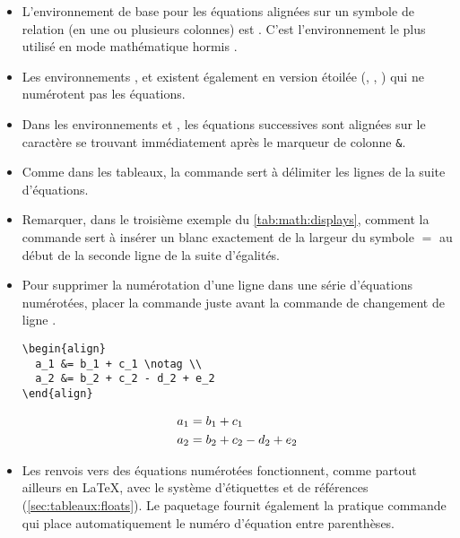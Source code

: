 \begin{itemize}
\item L'environnement de base pour les équations alignées sur un
  symbole de relation (en une ou plusieurs colonnes) est .
  C'est l'environnement le plus utilisé en mode mathématique hormis
  .
\item Les environnements ,  et 
  existent également en version étoilée (, ,
  ) qui ne numérotent pas les équations.
\item Dans les environnements  et , les équations
  successives sont alignées sur le caractère se trouvant immédiatement
  après le marqueur de colonne \verb=&=.
\item Comme dans les tableaux, la commande {\pixbsbs} sert à
  délimiter les lignes de la suite d'équations.
\item Remarquer, dans le troisième exemple du
  \autoref{tab:math:displays}, comment la commande \cmd{\phantom} sert
  à insérer un blanc exactement de la largeur du symbole $=$ au début
  de la seconde ligne de la suite d'égalités.
\item Pour supprimer la numérotation d'une ligne dans une série
  d'équations numérotées, placer la commande \cmd{\notag} juste avant
  la commande de changement de ligne {\bs\bs}.
  \begin{demo}
    \begin{texample}[0.53\linewidth]
\begin{lstlisting}
\begin{align}
  a_1 &= b_1 + c_1 \notag \\
  a_2 &= b_2 + c_2 - d_2 + e_2
\end{align}
\end{lstlisting}
      \producing
      \begin{align}
        a_1& =b_1+c_1 \notag \\
        a_2& =b_2+c_2-d_2+e_2
      \end{align}
    \end{texample}
  \end{demo}
\item Les renvois vers des équations numérotées fonctionnent, comme
  partout ailleurs en {\LaTeX}, avec le système d'étiquettes et de
  références (\autoref{sec:tableaux:floats}). Le paquetage
   fournit également la pratique commande \cmd{\eqref}
  qui place automatiquement le numéro d'équation entre parenthèses.
  \begin{demo}

\end{demo}
\end{itemize}
